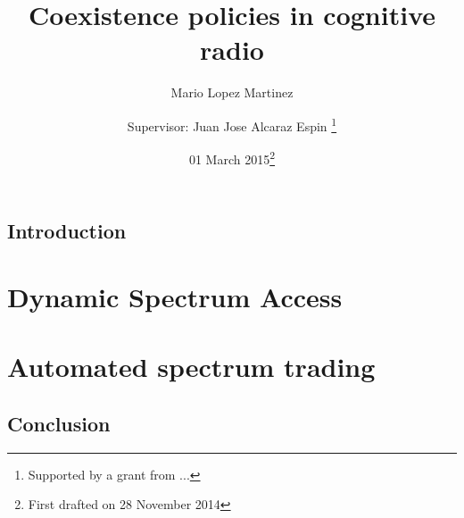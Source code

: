 \documentclass[10pt,a4paper]{memoir}
\begin{document}
\title{Coexistence policies in cognitive radio}
\author{Mario Lopez Martinez \and
Supervisor: Juan Jose Alcaraz Espin
        \thanks{Supported by a grant from ...}}
\date{01 March 2015\thanks{First drafted on 28 November 2014}}
\maketitle
\clearpage
%
\tableofcontents
\clearpage
\listoffigures
\clearpage
\listoftables
\clearpage

\chapter{Introduction}
% 
\part{Dynamic Spectrum Access}





\part{Automated spectrum trading}




\chapter{Conclusion}
% 

\clearpage

\end{document}

